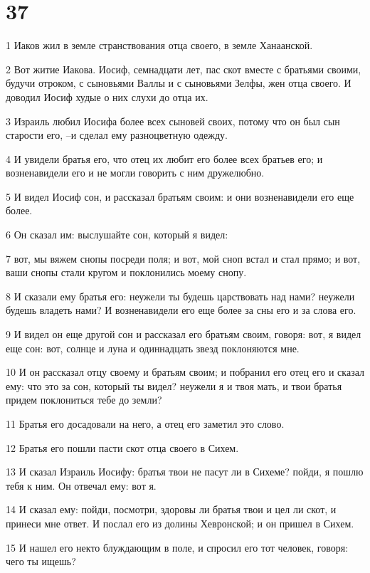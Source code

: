 \chapter{37}

\par 1 Иаков жил в земле странствования отца своего, в земле Ханаанской.
\par 2 Вот житие Иакова. Иосиф, семнадцати лет, пас скот вместе с братьями своими, будучи отроком, с сыновьями Валлы и с сыновьями Зелфы, жен отца своего. И доводил Иосиф худые о них слухи до отца их.
\par 3 Израиль любил Иосифа более всех сыновей своих, потому что он был сын старости его, --и сделал ему разноцветную одежду.
\par 4 И увидели братья его, что отец их любит его более всех братьев его; и возненавидели его и не могли говорить с ним дружелюбно.
\par 5 И видел Иосиф сон, и рассказал братьям своим: и они возненавидели его еще более.
\par 6 Он сказал им: выслушайте сон, который я видел:
\par 7 вот, мы вяжем снопы посреди поля; и вот, мой сноп встал и стал прямо; и вот, ваши снопы стали кругом и поклонились моему снопу.
\par 8 И сказали ему братья его: неужели ты будешь царствовать над нами? неужели будешь владеть нами? И возненавидели его еще более за сны его и за слова его.
\par 9 И видел он еще другой сон и рассказал его братьям своим, говоря: вот, я видел еще сон: вот, солнце и луна и одиннадцать звезд поклоняются мне.
\par 10 И он рассказал отцу своему и братьям своим; и побранил его отец его и сказал ему: что это за сон, который ты видел? неужели я и твоя мать, и твои братья придем поклониться тебе до земли?
\par 11 Братья его досадовали на него, а отец его заметил это слово.
\par 12 Братья его пошли пасти скот отца своего в Сихем.
\par 13 И сказал Израиль Иосифу: братья твои не пасут ли в Сихеме? пойди, я пошлю тебя к ним. Он отвечал ему: вот я.
\par 14 И сказал ему: пойди, посмотри, здоровы ли братья твои и цел ли скот, и принеси мне ответ. И послал его из долины Хевронской; и он пришел в Сихем.
\par 15 И нашел его некто блуждающим в поле, и спросил его тот человек, говоря: чего ты ищешь?

